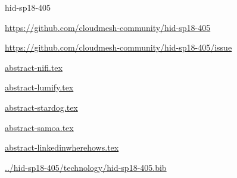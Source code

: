 \begin{IU}

hid-sp18-405

\url{https://github.com/cloudmesh-community/hid-sp18-405}

\url{https://github.com/cloudmesh-community/hid-sp18-405/issue}

\href{https://github.com/cloudmesh-community/hid-sp18-405/blob/master//technology/abstract-nifi.tex}{abstract-nifi.tex}

\href{https://github.com/cloudmesh-community/hid-sp18-405/blob/master//technology/abstract-lumify.tex}{abstract-lumify.tex}

\href{https://github.com/cloudmesh-community/hid-sp18-405/blob/master//technology/abstract-stardog.tex}{abstract-stardog.tex}

\href{https://github.com/cloudmesh-community/hid-sp18-405/blob/master//technology/abstract-samoa.tex}{abstract-samoa.tex}

\href{https://github.com/cloudmesh-community/hid-sp18-405/blob/master//technology/abstract-linkedinwherehows.tex}{abstract-linkedinwherehows.tex}

\href{https://github.com/cloudmesh-community/hid-sp18-405/blob/master//technology/hid-sp18-405.bib}{../hid-sp18-405/technology/hid-sp18-405.bib}

\end{IU}


